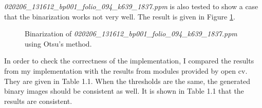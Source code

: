 \documentclass[paper=a4, fontsize=11pt]{scrartcl}
\numberwithin{equation}{section}		%
\numberwithin{figure}{section}			%
\numberwithin{table}{section}				%
\begin{document}
\emph{020206\_131612\_bp001\_folio\_094\_k639\_1837.ppm} is also tested to show a case that the binarization works not very well.
The result is given in Figure \ref{fig:binary:02}.

\begin{figure}[h]
\centering
{}
\caption{Binarization of \emph{020206\_131612\_bp001\_folio\_094\_k639\_1837.ppm}  using Otsu's method.}\label{fig:binary:02}
\end{figure}


In order to check the correctness of the implementation, I compared the results from my implementation with the results from modules provided by open cv.
They are given in Table 1.1. %
When the thresholds are the same, the generated binary images should be consistent as well.
It is shown in Table 1.1 that the results are consistent.
\end{document}
